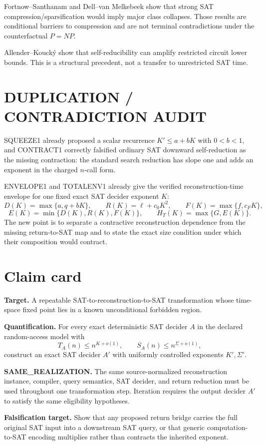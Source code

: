 \documentclass[11pt]{article}
\begin{document}
Fortnow--Santhanam and Dell--van Melkebeek show that strong SAT compression/sparsification would imply major class collapses. Those results are conditional barriers to compression and are not terminal contradictions under the counterfactual \(P=NP\).

Allender--Kouck\'y show that self-reducibility can amplify restricted circuit lower bounds. This is a structural precedent, not a transfer to unrestricted SAT time.

\section*{DUPLICATION / CONTRADICTION AUDIT}
SQUEEZE1 already proposed a scalar recurrence \(K'\le a+bK\) with \(0<b<1\), and CONTRACT1 correctly falsified ordinary SAT downward self-reduction as the missing contraction: the standard search reduction has slope one and adds an exponent in the charged \(n\)-call form.

ENVELOPE1 and TOTALENV1 already give the verified reconstruction-time envelope for one fixed exact SAT decider exponent \(K\):
\[
D(K)=\max\{a,q+bK\},\qquad
R(K)=\ell+c_0K^2,\qquad
F(K)=\max\{f,c_FK\},
\]
\[
E(K)=\min\{D(K),R(K),F(K)\},
\qquad
H_T(K)=\max\{G,E(K)\}.
\]
The new point is to separate a contractive reconstruction dependence from the missing return-to-SAT map and to state the exact size condition under which their composition would contract.

\section*{Claim card}
\textbf{Target.} A repeatable SAT-to-reconstruction-to-SAT transformation whose time-space fixed point lies in a known unconditional forbidden region.

\textbf{Quantification.} For every exact deterministic SAT decider \(A\) in the declared random-access model with
\[
T_A(n)\le n^{K+o(1)},\qquad S_A(n)\le n^{\Sigma+o(1)},
\]
construct an exact SAT decider \(A'\) with uniformly controlled exponents \(K',\Sigma'\).

\textbf{SAME\_REALIZATION.} The same source-normalized reconstruction instance, compiler, query semantics, SAT decider, and return reduction must be used throughout one transformation step. Iteration requires the output decider \(A'\) to satisfy the same eligibility hypotheses.

\textbf{Falsification target.} Show that any proposed return bridge carries the full original SAT input into a downstream SAT query, or that generic computation-to-SAT encoding multiplies rather than contracts the inherited exponent.
\end{document}
